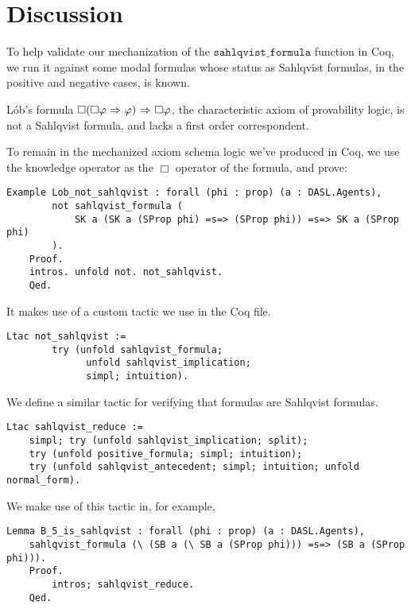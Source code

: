 \section{Discussion}
To help validate our mechanization of the $\mathtt{sahlqvist\_formula}$ function in Coq, we run it against some modal formulas whose status as Sahlqvist formulas, in the positive and negative cases, is known.

L\'ob's formula $\Box(\Box \varphi {\ \Rightarrow \ } \varphi) {\ \Rightarrow \ } \Box \varphi$, the characteristic axiom of provability logic, is not a Sahlqvist formula, and lacks a first order correspondent\cite{Boolos}.

To remain in the mechanized axiom schema logic we've produced in Coq, we use the knowledge operator as the $\Box$ operator of the formula, and prove:

\begin{tcolorbox}
	\begin{lstlisting}[language=Coq]
	Example Lob_not_sahlqvist : forall (phi : prop) (a : DASL.Agents),
		not sahlqvist_formula (
			SK a (SK a (SProp phi) =s=> (SProp phi)) =s=> SK a (SProp phi)
		).
	Proof.
	intros. unfold not. not_sahlqvist. 
	Qed.
	\end{lstlisting}
\end{tcolorbox}

It makes use of a custom tactic we use in the Coq file.

\begin{tcolorbox}
	\begin{lstlisting}[language=Coq]
	Ltac not_sahlqvist := 
		try (unfold sahlqvist_formula; 
			  unfold sahlqvist_implication; 
			  simpl; intuition).
	\end{lstlisting}
\end{tcolorbox}

We define a similar tactic for verifying that formulas are Sahlqvist formulas.

\begin{tcolorbox}
	\begin{lstlisting}[language=Coq]
	Ltac sahlqvist_reduce := 
	simpl; try (unfold sahlqvist_implication; split);
	try (unfold positive_formula; simpl; intuition);
	try (unfold sahlqvist_antecedent; simpl; intuition; unfold normal_form).
	\end{lstlisting}
\end{tcolorbox}

We make use of this tactic in, for example,

\begin{tcolorbox}
	\begin{lstlisting}[language=Coq]
	Lemma B_5_is_sahlqvist : forall (phi : prop) (a : DASL.Agents),
	sahlqvist_formula (\ (SB a (\ SB a (SProp phi))) =s=> (SB a (SProp phi))).
	Proof.
		intros; sahlqvist_reduce. 
	Qed.
	\end{lstlisting}
\end{tcolorbox}

